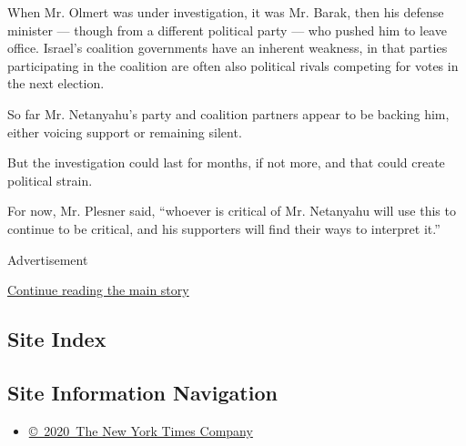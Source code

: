 When Mr. Olmert was under investigation, it was Mr. Barak, then his
defense minister --- though from a different political party --- who
pushed him to leave office. Israel's coalition governments have an
inherent weakness, in that parties participating in the coalition are
often also political rivals competing for votes in the next election.

So far Mr. Netanyahu's party and coalition partners appear to be backing
him, either voicing support or remaining silent.

But the investigation could last for months, if not more, and that could
create political strain.

For now, Mr. Plesner said, ``whoever is critical of Mr. Netanyahu will
use this to continue to be critical, and his supporters will find their
ways to interpret it.''

Advertisement

\protect\hyperlink{after-bottom}{Continue reading the main story}

\hypertarget{site-index}{%
\subsection{Site Index}\label{site-index}}

\hypertarget{site-information-navigation}{%
\subsection{Site Information
Navigation}\label{site-information-navigation}}

\begin{itemize}
\tightlist
\item
  \href{https://help.nytimes.com/hc/en-us/articles/115014792127-Copyright-notice}{©~2020~The
  New York Times Company}
\end{itemize}

